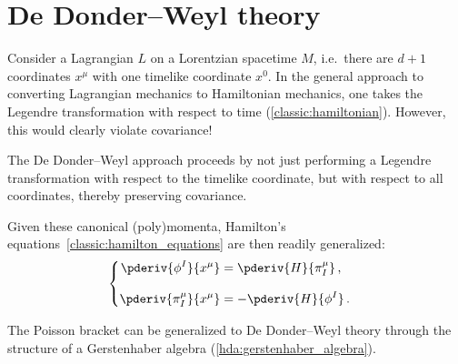 
\section{De Donder--Weyl theory}

    Consider a Lagrangian $L$ on a Lorentzian spacetime $M$, i.e.~there are $d+1$ coordinates $x^\mu$ with one timelike coordinate $x^0$. In the general approach to converting Lagrangian mechanics to Hamiltonian mechanics, one takes the Legendre transformation with respect to time (\cref{classic:hamiltonian}). However, this would clearly violate covariance!

    The De Donder--Weyl approach proceeds by not just performing a Legendre transformation with respect to the timelike coordinate, but with respect to all coordinates, thereby preserving covariance.


    Given these canonical (poly)momenta, Hamilton's equations~\ref{classic:hamilton_equations} are then readily generalized:
    \begin{gather}
        \begin{cases}
            \begin{aligned}
                \pderiv{\phi^I}{x^\mu} &= \pderiv{H}{\pi^\mu_I}\,,\\\\
                \pderiv{\pi^\mu_I}{x^\mu} &= -\pderiv{H}{\phi^I}\,.
            \end{aligned}
        \end{cases}
    \end{gather}

    \begin{remark}[Bracket]
        The Poisson bracket can be generalized to De Donder--Weyl theory through the structure of a Gerstenhaber algebra (\cref{hda:gerstenhaber_algebra}).
    \end{remark}